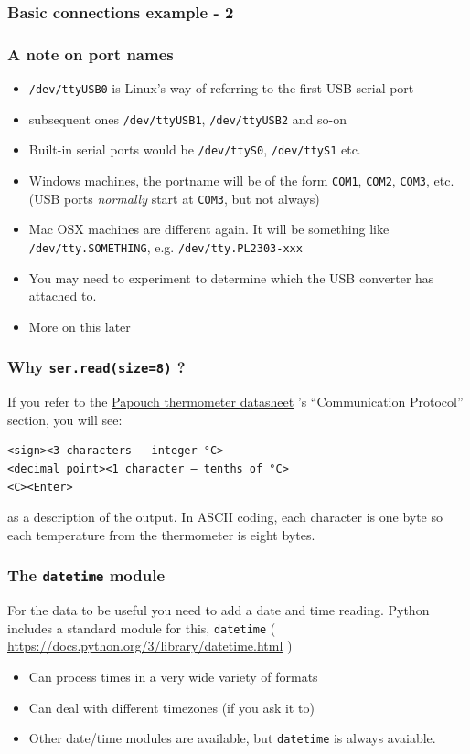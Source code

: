 \documentclass[aspectratio=1610,9pt]{beamer} %
\begin{document}
\begin{frame}[fragile]
\frametitle{Basic connections example - 2}

\subsubsection{A note on port names}

\begin{itemize}
\itemsep1pt\parskip0pt
\item
  \texttt{/dev/ttyUSB0} is Linux's way of referring to the first USB
  serial port
\item
  subsequent ones \texttt{/dev/ttyUSB1}, \texttt{/dev/ttyUSB2} and so-on
\item
  Built-in serial ports would be \texttt{/dev/ttyS0},
  \texttt{/dev/ttyS1} etc.
\item
  Windows machines, the portname will be of the form \texttt{COM1},
  \texttt{COM2}, \texttt{COM3}, etc. (USB ports \emph{normally} start at
  \texttt{COM3}, but not always)
\item
  Mac OSX machines are different again. It will be something like
  \texttt{/dev/tty.SOMETHING}, e.g. \texttt{/dev/tty.PL2303-xxx}
\item
  You may need to experiment to determine which the USB converter has
  attached to.
\item
  More on this later
\end{itemize}

\end{frame}
\begin{frame}[fragile]
\frametitle{Why \texttt{ser.read(size=8)} ?}
If you refer to the
\href{http://www.papouch.com/en/shop/product/tm-rs232-thermometer/tm_en.pdf}{Papouch
thermometer datasheet} 's ``Communication Protocol'' section, you will
see:

\begin{verbatim}
<sign><3 characters – integer °C>
<decimal point><1 character – tenths of °C>
<C><Enter>
\end{verbatim}

as a description of the output. In ASCII coding, each character is one
byte so each temperature from the thermometer is eight bytes.

\end{frame}
\begin{frame}
\frametitle{The \texttt{datetime} module}

For the data to be useful you need to add a date and time reading.
Python includes a standard module for this, \texttt{datetime} (
\url{https://docs.python.org/3/library/datetime.html}
)
\begin{itemize}
\item Can process times in a very wide variety of formats
\item Can deal with different timezones (if you ask it to)
\item Other date/time modules are available, but \texttt{datetime} is always avaiable.
\end{itemize}
\end{frame}
\end{document}
